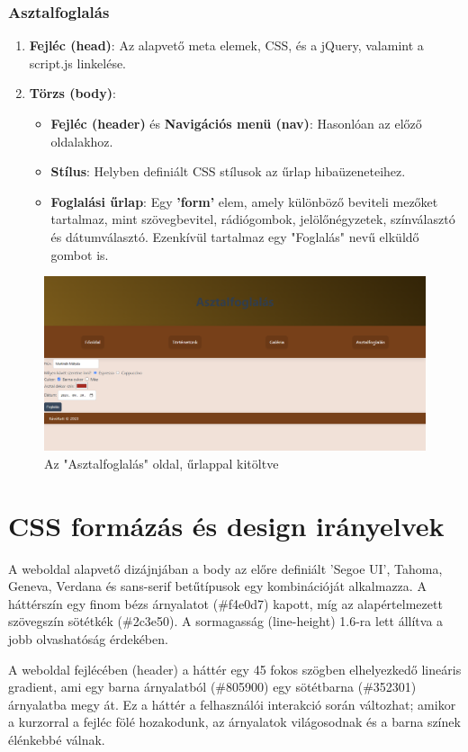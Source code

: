 \documentclass{article}
\begin{document}
\subsubsection{Asztalfoglalás}
\begin{enumerate}
	\item \textbf{Fejléc (head)}: Az alapvető meta elemek, CSS, és a jQuery, valamint a script.js linkelése.
	\item \textbf{Törzs (body)}:
		\begin{itemize}
			\item \textbf{Fejléc (header)} és \textbf{Navigációs menü (nav)}: Hasonlóan az előző oldalakhoz.
			\item \textbf{Stílus}: Helyben definiált CSS stílusok az űrlap hibaüzeneteihez.
			\item \textbf{Foglalási űrlap}: Egy \textbf{'form'} elem, amely különböző beviteli mezőket tartalmaz, mint szövegbevitel, rádiógombok, jelölőnégyzetek, színválasztó és dátumválasztó. Ezenkívül tartalmaz egy "Foglalás" nevű elküldő gombot is.
		\end{itemize}
\end{enumerate}
\begin{figure}[H]
	\centering
	\includegraphics[width=0.9\linewidth]{form.png}
	\caption{Az "Asztalfoglalás" oldal, űrlappal kitöltve}
	\label{fig:form}
\end{figure}
\section{CSS formázás és design irányelvek}
\indent\indent A weboldal alapvető dizájnjában a body az előre definiált 'Segoe UI', Tahoma, Geneva, Verdana és sans-serif betűtípusok egy kombinációját alkalmazza. A háttérszín egy finom bézs árnyalatot (\#f4e0d7) kapott, míg az alapértelmezett szövegszín sötétkék (\#2c3e50). A sormagasság (line-height) 1.6-ra lett állítva a jobb olvashatóság érdekében.

A weboldal fejlécében (header) a háttér egy 45 fokos szögben elhelyezkedő lineáris gradient, ami egy barna árnyalatból (\#805900) egy sötétbarna (\#352301) árnyalatba megy át. Ez a háttér a felhasználói interakció során változhat; amikor a kurzorral a fejléc fölé hozakodunk, az árnyalatok világosodnak és a barna színek élénkebbé válnak.
\end{document}
